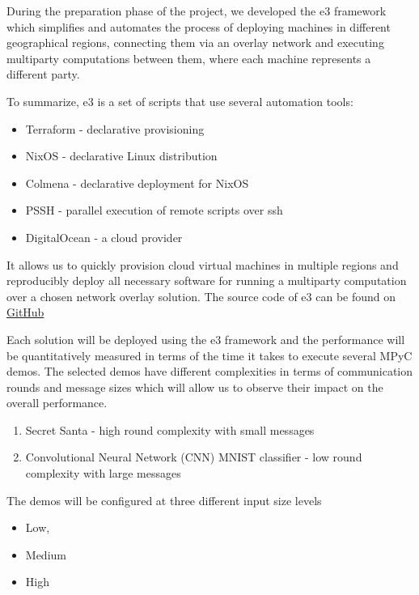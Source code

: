 During the preparation phase of the project, we developed the \gls{e3}
framework which simplifies and automates the process of deploying
machines in different geographical regions, connecting them via an
overlay network and executing multiparty computations between them,
where each machine represents a different party.

To summarize, \gls{e3} is a set of scripts that use several automation
tools:

\begin{itemize}
\tightlist
\item
  Terraform - declarative provisioning
\item
  NixOS - declarative Linux distribution
\item
  Colmena - declarative deployment for NixOS
\item
  PSSH - parallel execution of remote scripts over ssh
\item
  DigitalOcean - a cloud provider
\end{itemize}

It allows us to quickly provision cloud virtual machines in multiple
regions and reproducibly deploy all necessary software for running a
multiparty computation over a chosen network overlay solution. The
source code of \gls{e3} can be found on
\href{https://github.com/e-nikolov/mpyc}{GitHub}

Each solution will be deployed using the \gls{e3} framework and the
performance will be quantitatively measured in terms of the time it
takes to execute several MPyC demos. The selected demos have different
complexities in terms of communication rounds and message sizes which
will allow us to observe their impact on the overall performance.

\begin{enumerate}
\def\labelenumi{\arabic{enumi}.}
\tightlist
\item
  Secret Santa - high round complexity with small messages
\item
  Convolutional Neural Network (CNN) MNIST classifier - low round
  complexity with large messages
\end{enumerate}

The demos will be configured at three different input size levels

\begin{itemize}
\tightlist
\item
  Low,
\item
  Medium
\item
  High
\end{itemize}


